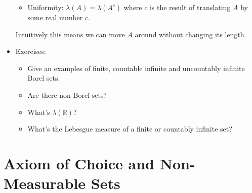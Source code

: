 \documentclass[justified]{tufte-handout}
\begin{document}
\begin{itemize}
\begin{itemize}

\item Uniformity: $\lambda(A) = \lambda(A^c)$ where $c$ is the result of translating $A$ by some real number $c$.

\end{itemize}

\noindent Intuitively this means we can move $A$ around without changing its length.

\item Exercises: 

\begin{itemize}


\item Give an examples of finite, countable infinite and uncountably infinite Borel sets.

\item Are there non-Borel sets?

\item What's  $\lambda(\mathbb{R})$?


\item What's the Lebesgue measure of a finite or countably infinite set? 



\end{itemize}




\end{itemize}


\section{Axiom of Choice and Non-Measurable Sets}
\end{document}

